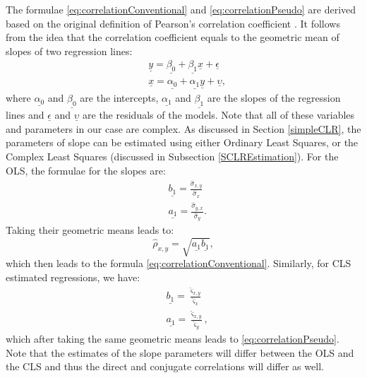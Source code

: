 \documentclass[
]{book}
\begin{document}
The formulae \eqref{eq:correlationConventional} and \eqref{eq:correlationPseudo} are derived based on the original definition of Pearson's correlation coefficient \citep{refPearson}. It follows from the idea that the correlation coefficient equals to the geometric mean of slopes of two regression lines:
\begin{equation}
    \begin{aligned}
        &\underline{y} = \underline{\beta_0} + \underline{\beta_1} \underline{x} + \underline{\epsilon} \\
        &\underline{x} = \underline{\alpha_0} + \underline{\alpha_1} \underline{y} + \underline{\upsilon} ,
    \end{aligned}
    \label{eq:twoRegressions}
\end{equation}
where \(\underline{\alpha_0}\) and \(\underline{\beta_0}\) are the intercepts, \(\underline{\alpha_1}\) and \(\underline{\beta_1}\) are the slopes of the regression lines and \(\underline{\epsilon}\) and \(\underline{\upsilon}\) are the residuals of the models. Note that all of these variables and parameters in our case are complex. As discussed in Section \ref{simpleCLR}, the parameters of slope can be estimated using either Ordinary Least Squares, or the Complex Least Squares (discussed in Subsection \ref{SCLREstimation}). For the OLS, the formulae for the slopes are:
\begin{equation}
    \begin{aligned}
        &\underline{b_1} = \frac{\hat{\sigma}_{x,y}}{\hat{\sigma}_x} \\
        &\underline{a_1} = \frac{\hat{\sigma}_{y,x}}{\hat{\sigma}_y} .
    \end{aligned}
    \label{eq:twoRegressionsOLS}
\end{equation}
Taking their geometric means leads to:
\begin{equation}
    \hat{\rho}_{x,y} = \sqrt{\underline{a_1} \underline{b_1}},
    \label{eq:correlationConventionalEstimate}
\end{equation}
which then leads to the formula \eqref{eq:correlationConventional}. Similarly, for CLS estimated regressions, we have:
\begin{equation}
    \begin{aligned}
        &\underline{b_1} = \frac{\hat{\varsigma}_{x,y}}{\hat{\varsigma}_x} \\
        &\underline{a_1} = \frac{\hat{\varsigma}_{x,y}}{\hat{\varsigma}_y} ,
    \end{aligned}
    \label{eq:twoRegressionsCLS}
\end{equation}
which after taking the same geometric means leads to \eqref{eq:correlationPseudo}. Note that the estimates of the slope parameters will differ between the OLS and the CLS and thus the direct and conjugate correlations will differ as well.
\end{document}
